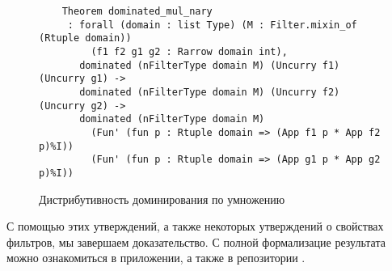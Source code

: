 \begin{figure}[H]
  \caption{Дистрибутивность доминирования по умножению}
  \label{code:dominated_mul_nary}
  \begin{verbatim}
    Theorem dominated_mul_nary
	 : forall (domain : list Type) (M : Filter.mixin_of (Rtuple domain))
         (f1 f2 g1 g2 : Rarrow domain int),
       dominated (nFilterType domain M) (Uncurry f1) (Uncurry g1) ->
       dominated (nFilterType domain M) (Uncurry f2) (Uncurry g2) ->
       dominated (nFilterType domain M)
         (Fun' (fun p : Rtuple domain => (App f1 p * App f2 p)%I))
         (Fun' (fun p : Rtuple domain => (App g1 p * App g2 p)%I))
  \end{verbatim}
\end{figure}

С помощью этих утверждений, а также некоторых утверждений о свойствах фильтров, мы завершаем доказательство.
С полной формализацие результата можно ознакомиться в приложении, а также в репозитории \cite{Grigoryants2021}.